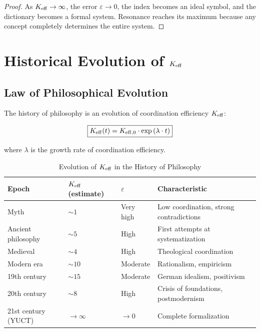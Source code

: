 \documentclass[12pt,a4paper]{article}
\newcommand{\eps}{\varepsilon}
\begin{document}
	\begin{proof}
		As \(\Keff \to \infty\), the error \(\eps \to 0\), the index becomes an ideal symbol, and the dictionary becomes a formal system. Resonance reaches its maximum because any concept completely determines the entire system.
	\end{proof}
	
	\section{Historical Evolution of \texorpdfstring{\(\Keff\)}{K\_eff}}
	
	\subsection{Law of Philosophical Evolution}
	
	The history of philosophy is an evolution of coordination efficiency \(\Keff\):
	
	\begin{equation}
		\boxed{
			\Keff(t) = \Keff[0] \cdot \exp\left(\lambda \cdot t\right)
		}
	\end{equation}
	
	where \(\lambda\) is the growth rate of coordination efficiency.
	
	\begin{table}[H]
		\centering
		\caption{Evolution of \(\Keff\) in the History of Philosophy}
		\begin{tabular}{p{3cm}p{3cm}p{3cm}p{4cm}}
			\toprule
			\textbf{Epoch} & \(\Keff\) (estimate) & \(\eps\) & \textbf{Characteristic} \\
			\midrule
			Myth & \(\sim 1\) & Very high & Low coordination, strong contradictions \\
			Ancient philosophy & \(\sim 5\) & High & First attempts at systematization \\
			Medieval & \(\sim 4\) & High & Theological coordination \\
			Modern era & \(\sim 10\) & Moderate & Rationalism, empiricism \\
			19th century & \(\sim 15\) & Moderate & German idealism, positivism \\
			20th century & \(\sim 8\) & High & Crisis of foundations, postmodernism \\
			21st century (YUCT) & \(\to \infty\) & \(\to 0\) & Complete formalization \\
			\bottomrule
		\end{tabular}
	\end{table}
	
\end{document}
